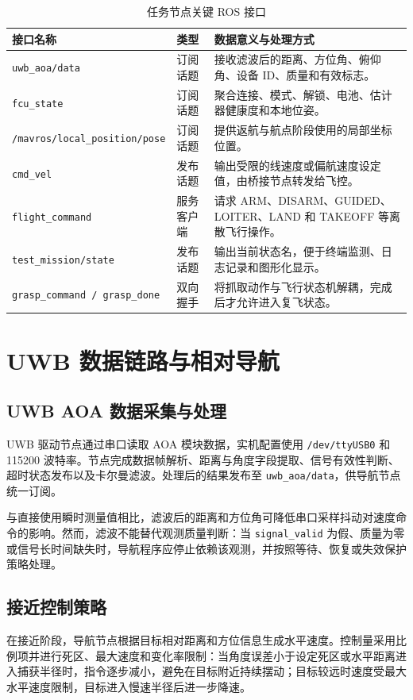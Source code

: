 \documentclass[12pt,a4paper]{ctexart}
\providecommand{\allowbreak}{\penalty0\relax}
\begin{document}
\begin{table}[htbp]
\centering
\caption{任务节点关键 ROS 接口}\label{tab:ros-interfaces}
{
\begin{tabular}{p{4.0cm}p{2.4cm}p{6.7cm}}
\hline
接口名称 & 类型 & 数据意义与处理方式 \\
\hline
\texttt{uwb\_aoa/data} & 订阅话题 & 接收滤波后的距离、方位角、俯仰角、设备 ID、质量和有效标志。\\
\texttt{fcu\_state} & 订阅话题 & 聚合连接、模式、解锁、电池、估计器健康度和本地位姿。\\
\texttt{/mavros/}\allowbreak\texttt{local\_position/}\allowbreak\texttt{pose} & 订阅话题 & 提供返航与航点阶段使用的局部坐标位置。\\
\texttt{cmd\_vel} & 发布话题 & 输出受限的线速度或偏航速度设定值，由桥接节点转发给飞控。\\
\texttt{flight\_command} & 服务客户端 & 请求 ARM、DISARM、GUIDED、LOITER、LAND 和 TAKEOFF 等离散飞行操作。\\
\texttt{test\_mission/state} & 发布话题 & 输出当前状态名，便于终端监测、日志记录和图形化显示。\\
\texttt{grasp\_command / grasp\_done} & 双向握手 & 将抓取动作与飞行状态机解耦，完成后才允许进入复飞状态。\\
\hline
\end{tabular}
}
\end{table}

\clearpage
\section{UWB 数据链路与相对导航}
\subsection{UWB AOA 数据采集与处理}
UWB 驱动节点通过串口读取 AOA 模块数据，实机配置使用 \texttt{/dev/ttyUSB0} 和 115200 波特率。节点完成数据帧解析、距离与角度字段提取、信号有效性判断、超时状态发布以及卡尔曼滤波。处理后的结果发布至 \texttt{uwb\_aoa/data}，供导航节点统一订阅。

与直接使用瞬时测量值相比，滤波后的距离和方位角可降低串口采样抖动对速度命令的影响。然而，滤波不能替代观测质量判断：当 \texttt{signal\_valid} 为假、质量为零或信号长时间缺失时，导航程序应停止依赖该观测，并按照等待、恢复或失效保护策略处理。

\subsection{接近控制策略}
在接近阶段，导航节点根据目标相对距离和方位信息生成水平速度。控制量采用比例项并进行死区、最大速度和变化率限制：当角度误差小于设定死区或水平距离进入捕获半径时，指令逐步减小，避免在目标附近持续摆动；目标较远时速度受最大水平速度限制，目标进入慢速半径后进一步降速。
\end{document}
